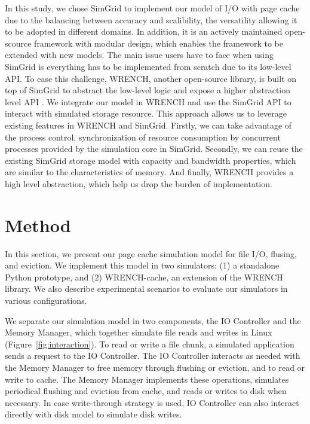 \documentclass[conference]{IEEEtran}
\begin{document}
            In this study, we chose SimGrid to implement our model of I/O with page cache 
            due to the balancing between accuracy and scalibility, the versatility allowing it 
            to be adopted in different domains. 
            In addition, it is an actively maintained open-scource framework with 
            modular design, which enables the framework to be extended with new models. 
            The main issue users have to face when using SimGrid is everything has to be 
            implemented from scratch due to its low-level API. 
            To ease this challenge, WRENCH, another open-source library, is built on top 
            of SimGrid to abstract the low-level logic and expose a higher abstraction 
            level API \cite{casanova2018wrench}. 
            We integrate our model in WRENCH and use the SimGrid API to interact with 
            simulated storage resource.
            This approach allows us to leverage existing features in WRENCH and SimGrid.
            Firstly, we can take advantage of the process control, synchronization of 
            resource consumption by concurrent processes provided by the simulation core 
            in SimGrid. 
            Secondly, we can reuse the existing SimGrid storage model with capacity 
            and bandwidth properties, which are similar to the characteristics of memory.
            And finally, WRENCH provides a high level abstraction, which help us drop 
            the burden of implementation. 
            
    \section{Method}
    \label{method}
    In this section, we present our page cache simulation model for file I/O,
    flusing, and eviction. We implement this model in two simulators:
    (1) a standalone Python prototype, and (2) WRENCH-cache, an extension of the WRENCH library.
    We also describe experimental scenarios to evaluate our simulators in various configurations.
     
    We separate our simulation model in two components, the IO
    Controller and the Memory Manager, which together simulate 
    file reads and writes in Linux (Figure~\ref{fig:interaction}). 
    To read or write a file chunk, a simulated application sends a
    request to the IO Controller. The IO Controller interacts as needed with
    the Memory Manager to free memory through flushing or eviction,
    and to read or write to cache. The Memory Manager
    implements these operations, simulates periodical flushing
    and eviction from cache, and reads or writes to disk when necessary.  
    In case write-through strategy is used, IO Controller can also interact directly 
    with disk model to simulate disk writes.
    
\end{document}
